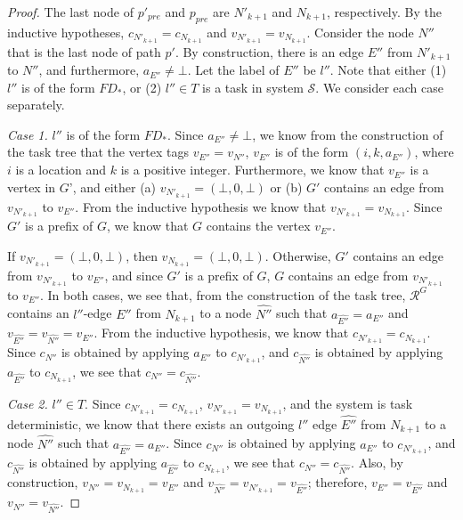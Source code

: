\documentclass[11pt]{article}
\numberwithin{theorem}{section}
\begin{document}
\begin{proof}
The last node of $p'_{pre}$ and $p_{pre}$ are $N'_{k+1}$ and $N_{k+1}$, respectively. By the inductive hypotheses, $c_{N'_{k+1}} = c_{N_{k+1}}$ and $v_{N'_{k+1}} = v_{N_{k+1}}$. Consider the node $N''$ that is the last node of path $p'$. By construction, there is an edge $E''$ from $N'_{k+1}$ to $N''$, and furthermore, $a_{E''} \neq \bot$. Let the label of $E''$ be $l''$. Note that either (1) $l''$ is of the form $FD_*$, or (2) $l'' \in T$ is a task in system $\mathcal{S}$. We consider each case separately.

\emph{Case 1.} $l''$ is of the form $FD_*$. Since $a_{E''} \neq \bot$, we know from the construction of the task tree that the vertex tags $v_{E''} = v_{N''}$, $v_{E''}$ is of the form $(i,k,a_{E''})$, where $i$ is a location and $k$ is a positive integer. Furthermore, we know that $v_{E''}$ is a vertex in $G$', and either (a) $v_{N'_{k+1}} = (\bot, 0, \bot)$ or (b) $G'$ contains an edge from $v_{N'_{k+1}}$ to $v_{E''}$. 
From the inductive hypothesis we know that $v_{N'_{k+1}} = v_{N_{k+1}}$. Since $G'$ is a prefix of $G$, we know that $G$ contains the vertex $v_{E''}$. 

If $v_{N'_{k+1}} = (\bot, 0, \bot)$, then $v_{N_{k+1}} = (\bot, 0, \bot)$. Otherwise, $G'$ contains an edge from $v_{N'_{k+1}}$ to $v_{E''}$, and since $G'$ is a prefix of $G$, $G$ contains an edge from $v_{N'_{k+1}}$ to $v_{E''}$.
In both cases, we see that, from the construction of the task tree, $\mathcal{R}^G$ contains an $l''$-edge $\widehat{E''}$ from $N_{k+1}$ to a node $\widehat{N''}$ such that $a_{\widehat{E''}} = a_{E''}$ and $v_{\widehat{E''}} = v_{\widehat{N''}} = v_{E''}$. From the inductive hypothesis, we know that $c_{N'_{k+1}} = c_{N_{k+1}}$.  Since $c_{N''}$ is obtained by applying $a_{E''}$ to $c_{N'_{k+1}}$, and $c_{\widehat{N''}}$ is obtained by applying $a_{\widehat{E''}}$ to $c_{N_{k+1}}$, we see that $c_{N''} = c_{\widehat{N''}}$.

\emph{Case 2.} $l'' \in T$. Since $c_{N'_{k+1}} = c_{N_{k+1}}$, $v_{N'_{k+1}} = v_{N_{k+1}}$, and the system is task deterministic, we know that there exists an outgoing $l''$ edge $\widehat{E''}$ from $N_{k+1}$ to a node $\widehat{N''}$ such that $a_{\widehat{E''}} = a_{E''}$. Since $c_{N''}$ is obtained by applying $a_{E''}$ to $c_{N'_{k+1}}$, and $c_{\widehat{N''}}$ is obtained by applying $a_{\widehat{E''}}$ to $c_{N_{k+1}}$, we see that $c_{N''} = c_{\widehat{N''}}$. Also, by construction, $v_{N''} = v_{N_{k+1}} = v_{E''}$ and $v_{\widehat{N''}} = v_{N'_{k+1}} = v_{\widehat{E''}}$; therefore, $v_{E''} = v_{\widehat{E''}}$ and $v_{N''} = v_{\widehat{N''}}$.


\end{proof}
\end{document}
